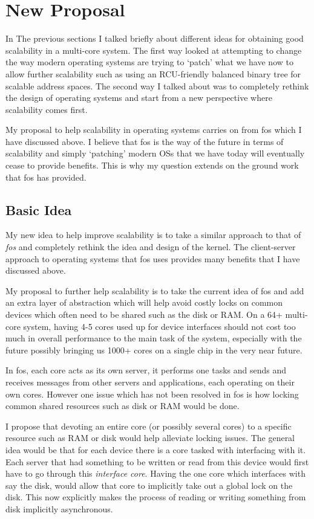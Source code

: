 \documentclass[journal]{IEEEtran}
\begin{document}
\section{New Proposal}

In The previous sections I talked briefly about different ideas for obtaining good scalability in a multi-core system. The first way looked at attempting to change the way modern operating systems are trying to `patch' what we have now to allow further scalability such as using an RCU-friendly balanced binary tree for scalable address spaces. The second way I talked about was to completely rethink the design of operating systems and start from a new perspective where scalability comes first.

My proposal to help scalability in operating systems carries on from fos which I have discussed above. I believe that fos is the way of the future in terms of scalability and simply `patching' modern OSs that we have today will eventually cease to provide benefits. This is why my question extends on the ground work that fos has provided.

\subsection{Basic Idea}
My new idea to help improve scalability is to take a similar approach to that of \emph{fos} \cite{fos} and completely rethink the idea and design of the kernel. The client-server approach to operating systems that fos uses provides many benefits that I have discussed above. 

My proposal to further help scalability is to take the current idea of fos and add an extra layer of abstraction which will help avoid costly locks on common devices which often need to be shared such as the disk or RAM. On a 64+ multi-core system, having 4-5 cores used up for device interfaces should not cost too much in overall performance to the main task of the system, especially with the future possibly bringing us 1000+ cores on a single chip in the very near future. 

In fos, each core acts as its own server, it performs one tasks and sends and receives messages from other servers and applications, each operating on their own cores. However one issue which has not been resolved in fos is how locking common shared resources such as disk or RAM would be done.

I propose that devoting an entire core (or possibly several cores) to a specific resource such as RAM or disk would help alleviate locking issues. The general idea would be that for each device there is a core tasked with interfacing with it. Each server that had something to be written or read from this device would first have to go through this \emph{interface core}. Having the one core which interfaces with say the disk, would allow that core to implicitly take out a global lock on the disk. This now explicitly makes the process of reading or writing something from disk implicitly asynchronous. 
\end{document}
